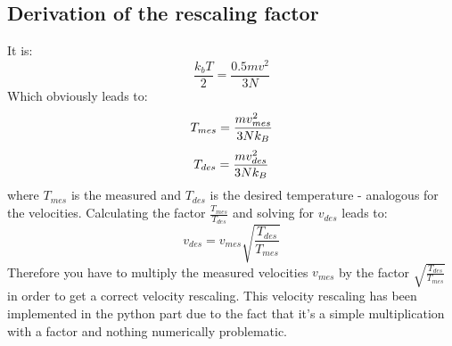 \documentclass[12pt,a4paper]{scrartcl}
\begin{document}
 \subsection{Derivation of the rescaling factor}
 It is: 
 \begin{equation}
 \frac{k_bT}{2}=\frac{0.5mv^2}{3N}
 \end{equation}
 Which obviously leads to:
  \begin{equation}\nonumber
 T_{mes}=\frac{mv_{mes}^2}{3Nk_B} \\
 \end{equation}
\begin{equation}\nonumber
  T_{des}=\frac{mv_{des}^2}{3Nk_B} \\
\end{equation}
where $T_{mes}$ is the measured and $T_{des}$ is the desired temperature - analogous for the velocities.
Calculating the factor $\frac{T_{mes}}{T_{des}}$ and solving for $v_{des}$ leads to:
\begin{equation}
v_{des}=v_{mes} \sqrt{\frac{T_{des}}{T_{mes}}}
\end{equation}
Therefore you have to multiply the measured velocities $v_{mes}$ by the factor $\sqrt{\frac{T_{des}}{T_{mes}}}$ in order to get a correct velocity rescaling.
\newline
\newline
This velocity rescaling has been implemented in the python part due to the fact that it's a simple multiplication with a factor and nothing numerically problematic.

\end{document}
